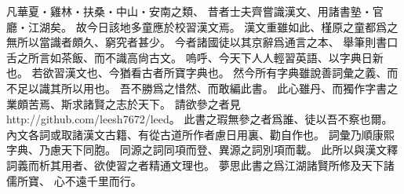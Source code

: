 凡華夏・雞林・扶桑・中山・安南之類、
昔者士夫齊嘗識漢文、用諸書塾・官廳・江湖矣。
故今日該地多童應於校習漢文焉。
漢文重雖如此、槿原之童都爲之無所以當識者頗久、窮究者甚少。
今者諸國徒以其京辭爲通言之本、
舉筆則書口舌之所言如茶飯、而不識高尙古文。
嗚呼、今天下人人輕習英語、以字典日新也。
若欲習漢文也、今猶看古者所寶字典也。
然今所有字典雖說善詞彙之義、而不足以識其所以用也。
吾不勝爲之惜然、而敢編此書。
此心雖丹、而獨作字書之業頗苦焉、斯求諸賢之志於天下。
請欲參之者見 http://github.com/leesh7672/leed。
此書之瑕無參之者爲誰、徒以吾不察也爾。
內文各詞或取諸漢文古籍、有從古道所作者慮日用裏、勸自作也。
詞彙乃順康熙字典、乃慮天下同胞。
同源之詞同項而登、異源之詞別項而載。
此所以與漢文釋詞義而析其用者、欲使習之者精通文理也。
夢思此書之爲江湖諸賢所修及天下諸儒所寶、
心不遠千里而行。
